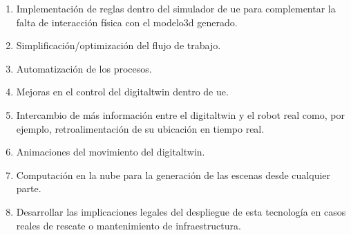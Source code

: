 \documentclass[a4paper, 12pt, spanish, twoside]{article}
\begin{document}
\begin{enumerate} 
\item Implementación de reglas dentro del simulador de \acrshort{ue} para complementar la falta de interacción física con el \gls{modelo3d} generado. 
\item Simplificación/optimización del flujo de trabajo. 
\item Automatización de los procesos. 
\item Mejoras en el control del \gls{digitaltwin} dentro de \acrshort{ue}. 
\item Intercambio de más información entre el \gls{digitaltwin} y el robot real como, por ejemplo, retroalimentación de su ubicación en tiempo real. 
\item Animaciones del movimiento del \gls{digitaltwin}. 
\item Computación en la nube para la generación de las escenas desde cualquier parte. 
\item Desarrollar las implicaciones legales del despliegue de esta tecnología en casos reales de rescate o mantenimiento de infraestructura. 
\end{enumerate}  

\clearpage





\newpage
\appto{\bibsetup}{\sloppy}
\printbibliography[heading=bibintoc, title=BIBLIOGRAFÍA] %

\clearpage









\end{document}
